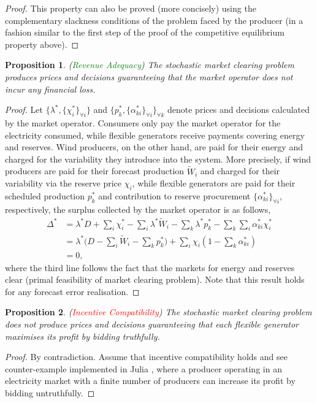 \documentclass{article}
\newtheorem{proposition}{Proposition}
\begin{document}
\begin{proof}
This property can also be proved (more concisely) using the complementary slackness conditions of the problem faced by the producer (in a fashion similar to the first step of the proof of the competitive equilibrium property above). 
\end{proof}

\begin{proposition}
(\textcolor{green}{Revenue Adequacy}) The stochastic market clearing problem produces prices and decisions guaranteeing that the market operator does not incur any financial loss.
\end{proposition}
\begin{proof}
Let $\{\lambda^*, \{\chi_i^*\}_{\forall i}\}$ and $\{p_k^*, \{\alpha_{ki}^*\}_{\forall i}\}_{\forall k}$ denote prices and decisions calculated by the market operator. Consumers only pay the market operator for the electricity consumed, while flexible generators receive payments covering energy and reserves. Wind producers, on the other hand, are paid for their energy and charged for the variability they introduce into the system. More precisely, if wind producers are paid for their forecast production $\tilde{W}_i$ and charged for their variability via the reserve price $\chi_i$, while flexible generators are paid for their scheduled production $p_k^*$ and contribution to reserve procurement $\{\alpha_{ki}^*\}_{\forall i}$, respectively, the surplus collected by the market operator is as follows,
\begin{align*}
\Delta^* &= \lambda^*D + \sum_i \chi_i^* - \sum_i \lambda^*\tilde{W}_i - \sum_k \lambda^*p_k^* - \sum_k \sum_i \alpha_{ki}^* \chi_i^*\\
&= \lambda^*\big(D - \sum_i \tilde{W}_i - \sum_k p_k^*\big) + \sum_i \chi_i (1 - \sum_k \alpha_{ki}^*)\\
&= 0,
\end{align*}
where the third line follows the fact that the markets for energy and reserves clear (primal feasibility of market clearing problem). Note that this result holds for any forecast error realisation.
\end{proof}

\begin{proposition}
(\textcolor{red}{Incentive Compatibility}) The stochastic market clearing problem does not produce prices and decisions guaranteeing that each flexible generator maximises its profit by bidding truthfully.
\end{proposition}
\begin{proof}
By contradiction. Assume that incentive compatibility holds and see counter-example implemented in Julia \cite{SMER2022}, where a producer operating in an electricity market with a finite number of producers can increase its profit by bidding untruthfully.
\end{proof}
\end{document}

